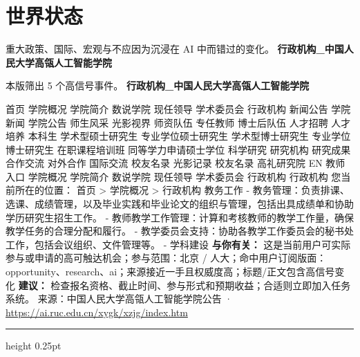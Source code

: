 \documentclass[10.5pt]{ctexart}
\begin{document}
\section*{世界状态}
{\color{ormuted} 重大政策、国际、宏观与不应因为沉浸在 AI 中而错过的变化。}
\vspace{2mm}
{\LARGE\bfseries 行政机构\_中国人民大学高瓴人工智能学院}\par
\vspace{1mm}
{\color{ormuted} 本版筛出 5 个高信号事件。}
\vspace{3mm}
{\Large\bfseries 行政机构\_中国人民大学高瓴人工智能学院}\par
首页 学院概况 学院简介 数说学院 现任领导 学术委员会 行政机构 新闻公告 学院新闻 学院公告 师生风采 光影视界 师资队伍 专任教师 博士后队伍 人才招聘 人才培养 本科生 学术型硕士研究生 专业学位硕士研究生 学术型博士研究生 专业学位博士研究生 在职课程培训班 同等学力申请硕士学位 科学研究 研究机构 研究成果 合作交流 对外合作 国际交流 校友名录 光影记录 校友名录 高礼研究院 EN 教师入口 学院概况 学院简介 数说学院 现任领导 学术委员会 行政机构 行政机构 您当前所在的位置： 首页 > 学院概况 > 行政机构 教务工作 - 教务管理：负责排课、选课、成绩管理，以及毕业实践和毕业论文的组织与管理，包括出具成绩单和协助学历研究生招生工作。 - 教师教学工作管理：计算和考核教师的教学工作量，确保教学任务的合理分配和履行。 - 教学委员会支持：协助各教学工作委员会的秘书处工作，包括会议组织、文件管理等。 - 学科建设
\textbf{与你有关：} 这是当前用户可实际参与或申请的高可触达机会；参与范围：北京 / 人大；命中用户订阅版面：opportunity、research、ai；来源接近一手且权威度高；标题/正文包含高信号变化
\textbf{建议：} 检查报名资格、截止时间、参与形式和预期收益；合适则立即加入任务系统。
{\footnotesize\color{ormuted} 来源：中国人民大学高瓴人工智能学院公告 · \url{https://ai.ruc.edu.cn/xygk/xzjg/index.htm}}
\vspace{4mm}
\hrule height 0.25pt
\vspace{3mm}
\end{document}
